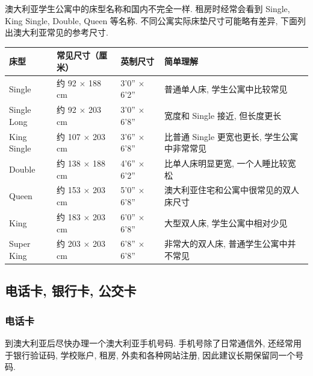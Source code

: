 \documentclass[UTF8,a4paper,12pt]{ctexart}
\newif\ifcourseopen
\newif\ifcourseheaderprinted
\newcounter{courseitem}
\newcommand{\finishcourse}{%
 \ifcourseopen
 \par\end{minipage}\end{tcolorbox}%
 \courseopenfalse
 \fi
}
\newcommand{\coursereset}{\finishcourse\setcounter{courseitem}{0}\courseheaderprintedfalse}
\let\origsubsection\subsection
\renewcommand{\subsection}{\coursereset\origsubsection}
\let\origsubsubsection\subsubsection
\renewcommand{\subsubsection}{\coursereset\origsubsubsection}
\begin{document}
澳大利亚学生公寓中的床型名称和国内不完全一样. 租房时经常会看到 Single, King Single, Double, Queen 等名称. 不同公寓实际床垫尺寸可能略有差异, 下面列出澳大利亚常见的参考尺寸.

\scriptsize
\renewcommand{\arraystretch}{1.15}

\begin{longtable}{@{}p{}p{}p{}p{}@{}}

\toprule

床型 & 常见尺寸（厘米） & 英制尺寸 & 简单理解 \\

\midrule

\endhead

\bottomrule

\endfoot

Single & 约 92 $\times$ 188 cm & 3'0'' $\times$ 6'2'' & 普通单人床, 学生公寓中比较常见 \\

Single Long & 约 92 $\times$ 203 cm & 3'0'' $\times$ 6'8'' & 宽度和 Single 接近, 但长度更长 \\

King Single & 约 107 $\times$ 203 cm & 3'6'' $\times$ 6'8'' & 比普通 Single 更宽也更长, 学生公寓中非常常见 \\

Double & 约 138 $\times$ 188 cm & 4'6'' $\times$ 6'2'' & 比单人床明显更宽, 一个人睡比较宽松 \\

Queen & 约 153 $\times$ 203 cm & 5'0'' $\times$ 6'8'' & 澳大利亚住宅和公寓中很常见的双人床尺寸 \\

King & 约 183 $\times$ 203 cm & 6'0'' $\times$ 6'8'' & 大型双人床, 学生公寓中相对少见 \\

Super King & 约 203 $\times$ 203 cm & 6'8'' $\times$ 6'8'' & 非常大的双人床, 普通学生公寓中并不常见 \\

\end{longtable}

\normalsize

\subsection{电话卡, 银行卡, 公交卡}
\subsubsection{电话卡}
到澳大利亚后尽快办理一个澳大利亚手机号码. 手机号除了日常通信外, 还经常用于银行验证码, 学校账户, 租房, 外卖和各种网站注册, 因此建议长期保留同一个号码. 
\end{document}
